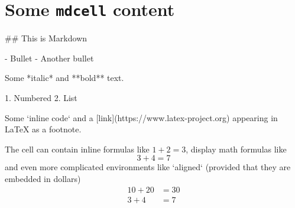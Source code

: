 \documentclass[oneside]{book}
\begin{document}
\chapter{Some \texttt{mdcell} content}

\begin{mdcell}
## This is Markdown

- Bullet
- Another bullet

Some *italic* and **bold** text.

1. Numbered
2. List

Some `inline code` and a [link](https://www.latex-project.org) appearing in LaTeX as a footnote.

The cell can contain inline formulas like $1 + 2 = 3$, display math formulas like
$$3 + 4 = 7$$
and even more complicated environments like `aligned` (provided that they are embedded in dollars)
$$\begin{aligned}
10 + 20 &= 30\\
3 + 4 &= 7
\end{aligned}$$
\end{mdcell}
\end{document}
